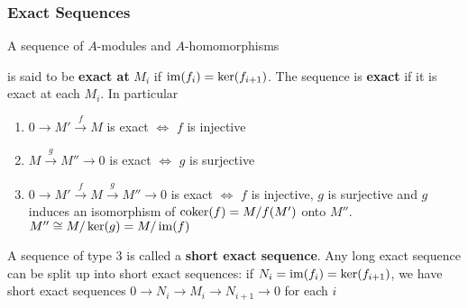 \documentclass[11pt]{article}
\begin{document}
\subsubsection*{Exact Sequences}
\label{sec:orge7ae107}
A sequence of \(A\)-modules and \(A\)-homomorphisms
\begin{center}\end{center}
is said to be \textbf{exact at} \(M_i\) if \(\operatorname{im}(f_i)=\ker(f_{i+1})\). The sequence is \textbf{exact} if it is exact
at each \(M_i\). In particular
\begin{enumerate}
\item \(0\to M'\xrightarrow{f}M\) is exact \(\Leftrightarrow\) \(f\) is injective
\item \(M\xrightarrow{g}M''\to 0\) is exact \(\Leftrightarrow\) \(g\) is surjective
\item \(0\to M'\xrightarrow{f}M\xrightarrow{g}M''\to 0\) is exact \(\Leftrightarrow\) \(f\) is injective, \(g\) is surjective and \(g\)
induces an isomorphism of \(\operatorname{coker}(f)=M/f(M')\) onto \(M''\).
\(M''\cong M/\ker(g)=M/\operatorname{im}(f)\)
\end{enumerate}


A sequence of type 3 is called a \textbf{short exact sequence}. Any long exact sequence can be split up
into short exact sequences: if \(N_i=\operatorname{im}(f_i)=\ker(f_{i+1})\), we have short exact
sequences \(0\to N_i\to M_i\to N_{i+1}\to 0\) for each \(i\)
\end{document}
